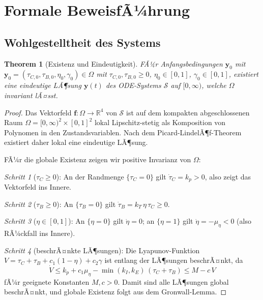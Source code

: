 ﻿\documentclass[12pt,a4paper]{article}
\newtheorem{theorem}{Theorem}[section]
\theoremstyle{definition}
\newcommand{\R}{\mathbb{R}}
\begin{document}
	\section{Formale BeweisfÃ¼hrung}
	
	\subsection{Wohlgestelltheit des Systems}
	
	\begin{theorem}[Existenz und Eindeutigkeit]
		\label{thm:existence}
		FÃ¼r Anfangsbedingungen $\mathbf{y}_0$ mit $\mathbf{y}_0 = (\tau_{C,0}, \tau_{B,0}, \eta_0, \gamma_0) \in \Omega$ mit $\tau_{C,0}, \tau_{B,0} \geq 0$, $\eta_0 \in [0,1]$, $\gamma_0 \in [0,1]$, existiert eine eindeutige LÃ¶sung $\mathbf{y}(t)$ des ODE-Systems $\mathcal{S}$ auf $[0, \infty)$, welche $\Omega$ invariant lÃ¤sst.
	\end{theorem}
	
	\begin{proof}
		Das Vektorfeld $\mathbf{f}: \Omega \to \R^4$ von $\mathcal{S}$ ist auf dem kompakten abgeschlossenen Raum $\Omega = [0,\infty)^2 \times [0,1]^2$ lokal Lipschitz-stetig als Komposition von Polynomen in den Zustandsvariablen. Nach dem Picard-LindelÃ¶f-Theorem existiert daher lokal eine eindeutige LÃ¶sung.
		
		FÃ¼r die globale Existenz zeigen wir positive Invarianz von $\Omega$:
		
		\emph{Schritt 1} ($\tau_C \geq 0$): An der Randmenge $\{\tau_C = 0\}$ gilt $\dot{\tau}_C = k_p > 0$, also zeigt das Vektorfeld ins Innere. \checkmark
		
		\emph{Schritt 2} ($\tau_B \geq 0$): An $\{\tau_B = 0\}$ gilt $\dot{\tau}_B = k_T\,\eta\,\tau_C \geq 0$. \checkmark
		
		\emph{Schritt 3} ($\eta \in [0,1]$): An $\{\eta = 0\}$ gilt $\dot{\eta} = 0$; an $\{\eta = 1\}$ gilt $\dot{\eta} = -\mu_\eta < 0$ (also RÃ¼ckfall ins Innere). \checkmark
		
		\emph{Schritt 4} (beschrÃ¤nkte LÃ¶sungen): Die Lyapunov-Funktion $V = \tau_C + \tau_B + c_1(1-\eta) + c_2\gamma$ ist entlang der LÃ¶sungen beschrÃ¤nkt, da
		\[
		\dot{V} \leq k_p + c_1\mu_\eta - \min(k_I, k_E)\,(\tau_C + \tau_B) \leq M - c\,V
		\]
		fÃ¼r geeignete Konstanten $M, c > 0$. Damit sind alle LÃ¶sungen global beschrÃ¤nkt, und globale Existenz folgt aus dem Gronwall-Lemma.
	\end{proof}
	
\end{document}
